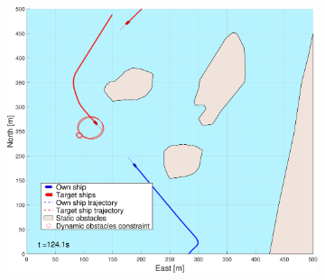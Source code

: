 \begin{figure}[!ht] %
    \begin{subfigure}[b]{0.494\textwidth}
        \centering
        \includegraphics[width=\textwidth]{Images/NewFigures/Helloya/_Simple_0fig1_time=125}
        \subcaption{}
    \end{subfigure}

\end{figure}
